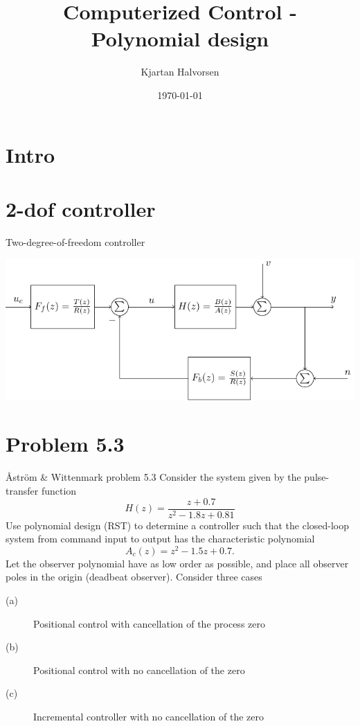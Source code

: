 \documentclass[presentation,aspectratio=169]{beamer}
\author{Kjartan Halvorsen}
\date{\today}
\title{Computerized Control - Polynomial design}
\begin{document}
\maketitle


\section{Intro}
\label{sec-1}


\section{2-dof controller}
\label{sec-2}

\begin{frame}[label=sec-2-1]{Two-degree-of-freedom controller}
\begin{center}
\includegraphics[width=0.8\linewidth]{../../figures/2dof-block-explicit-no-delay}
\end{center}
\end{frame}

\section{Problem 5.3}
\label{sec-3}
\begin{frame}[label=sec-3-1]{Åström \& Wittenmark problem 5.3}
Consider the system given by the pulse-transfer function
\[ H(z) = \frac{z+0.7}{z^2 -1.8z + 0.81} \]
Use polynomial design (RST) to determine a controller such that the closed-loop system from command input to output has the characteristic polynomial
\[ A_c(z) = z^2 - 1.5z + 0.7. \]
Let the observer polynomial have as low order as possible, and place all observer poles in the origin (deadbeat observer). Consider three cases
\begin{description}
\item[{(a)}] Positional control with cancellation of the process zero
\item[{(b)}] Positional control with no cancellation of the zero
\item[{(c)}] Incremental controller with  no cancellation of the zero
\end{description}
\end{frame}
\end{document}
